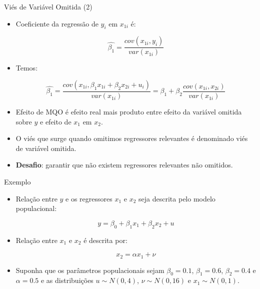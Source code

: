 \documentclass[10pt,slides,xcolor=pdftex,dvipsnames,table]{beamer}
\begin{document}

\begin{frame}{Viés de Variável Omitida (2)}

\begin{itemize}\itemsep1.2em 
	
	\item Coeficiente da regressão de $y_i$ em $x_{1i}$ é: 
	
	$$ \hat{\beta_1} = \frac{cov (x_{1i},y_i)}{var(x_{1i})} $$
	
	\item Temos: 
	
	$$ \hat{\beta_1} = \frac{cov (x_{1i},\beta_1 x_{1i} + \beta_2 x_{2i} + u_i )}{var(x_{1i})} = \beta_1 + \beta_2 \frac{cov (x_{1i},x_{2i})}{var(x_{1i})} $$
	
	\item Efeito de MQO é efeito real mais produto entre efeito da variável omitida sobre $y$ e efeito de $x_1$ em $x_2$. 
	
	\item O viés que surge quando omitimos regressores relevantes é denominado viés de variável omitida.
	
	\item \textbf{Desafio}: garantir que não existem regressores relevantes não omitidos.
        
\end{itemize}

\end{frame}


\begin{frame}{Exemplo}

\begin{itemize}\itemsep1.2em

\item Relação entre $y$ e os regressores $x_1$ e $x_2$ seja descrita pelo modelo populacional:

$$ y = \beta_0 + \beta_1 x_1 + \beta_2 x_2 + u $$

\item Relação entre $x_1$ e $x_2$ é descrita por:

$$ x_2 = \alpha x_1 + \nu $$

\item Suponha que os parâmetros populacionais sejam $\beta_0 = 0.1$, $\beta_1 = 0.6$, $\beta_2 = 0.4$ e $\alpha = 0.5$ e as distribuições $u \sim N(0,4)$, $\nu \sim N(0,16)$ e $x_1 \sim N(0,1)$.

\end{itemize}

\end{frame}
\end{document}
